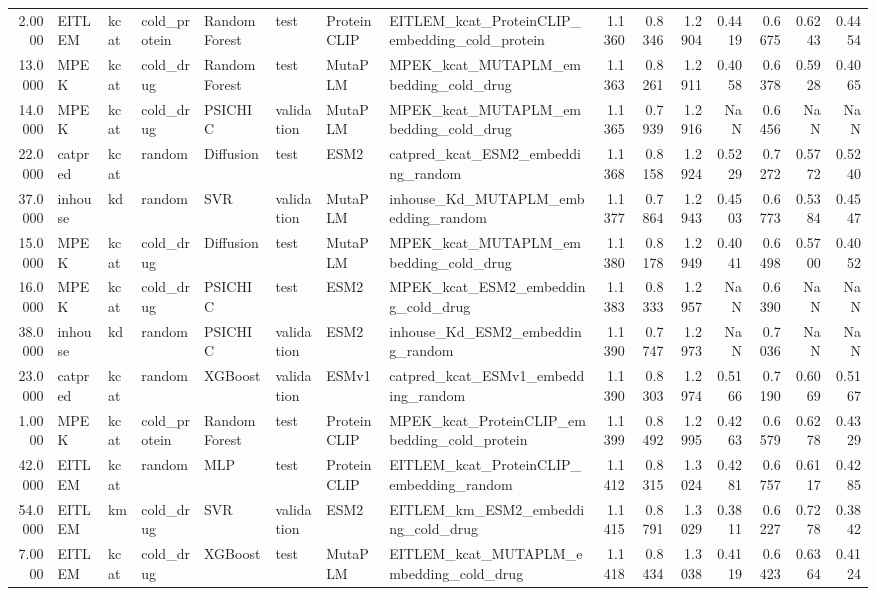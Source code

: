 \begin{tabular}{rlllllllrrrrrrr}
2.0000 & EITLEM & kcat & cold_protein & Random Forest & test & ProteinCLIP & EITLEM_kcat_ProteinCLIP_embedding_cold_protein & 1.1360 & 0.8346 & 1.2904 & 0.4419 & 0.6675 & 0.6243 & 0.4454 \\
13.0000 & MPEK & kcat & cold_drug & Random Forest & test & MutaPLM & MPEK_kcat_MUTAPLM_embedding_cold_drug & 1.1363 & 0.8261 & 1.2911 & 0.4058 & 0.6378 & 0.5928 & 0.4065 \\
14.0000 & MPEK & kcat & cold_drug & PSICHIC & validation & MutaPLM & MPEK_kcat_MUTAPLM_embedding_cold_drug & 1.1365 & 0.7939 & 1.2916 & NaN & 0.6456 & NaN & NaN \\
22.0000 & catpred & kcat & random & Diffusion & test & ESM2 & catpred_kcat_ESM2_embedding_random & 1.1368 & 0.8158 & 1.2924 & 0.5229 & 0.7272 & 0.5772 & 0.5240 \\
37.0000 & inhouse & kd & random & SVR & validation & MutaPLM & inhouse_Kd_MUTAPLM_embedding_random & 1.1377 & 0.7864 & 1.2943 & 0.4503 & 0.6773 & 0.5384 & 0.4547 \\
15.0000 & MPEK & kcat & cold_drug & Diffusion & test & MutaPLM & MPEK_kcat_MUTAPLM_embedding_cold_drug & 1.1380 & 0.8178 & 1.2949 & 0.4041 & 0.6498 & 0.5700 & 0.4052 \\
16.0000 & MPEK & kcat & cold_drug & PSICHIC & test & ESM2 & MPEK_kcat_ESM2_embedding_cold_drug & 1.1383 & 0.8333 & 1.2957 & NaN & 0.6390 & NaN & NaN \\
38.0000 & inhouse & kd & random & PSICHIC & validation & ESM2 & inhouse_Kd_ESM2_embedding_random & 1.1390 & 0.7747 & 1.2973 & NaN & 0.7036 & NaN & NaN \\
23.0000 & catpred & kcat & random & XGBoost & validation & ESMv1 & catpred_kcat_ESMv1_embedding_random & 1.1390 & 0.8303 & 1.2974 & 0.5166 & 0.7190 & 0.6069 & 0.5167 \\
1.0000 & MPEK & kcat & cold_protein & Random Forest & test & ProteinCLIP & MPEK_kcat_ProteinCLIP_embedding_cold_protein & 1.1399 & 0.8492 & 1.2995 & 0.4263 & 0.6579 & 0.6278 & 0.4329 \\
42.0000 & EITLEM & kcat & random & MLP & test & ProteinCLIP & EITLEM_kcat_ProteinCLIP_embedding_random & 1.1412 & 0.8315 & 1.3024 & 0.4281 & 0.6757 & 0.6117 & 0.4285 \\
54.0000 & EITLEM & km & cold_drug & SVR & validation & ESM2 & EITLEM_km_ESM2_embedding_cold_drug & 1.1415 & 0.8791 & 1.3029 & 0.3811 & 0.6227 & 0.7278 & 0.3842 \\
7.0000 & EITLEM & kcat & cold_drug & XGBoost & test & MutaPLM & EITLEM_kcat_MUTAPLM_embedding_cold_drug & 1.1418 & 0.8434 & 1.3038 & 0.4119 & 0.6423 & 0.6364 & 0.4124 \\

\end{tabular}
